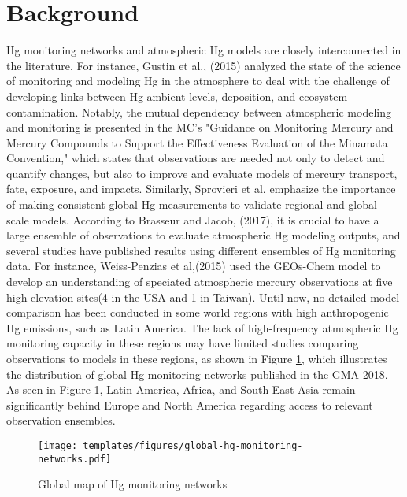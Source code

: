 \section{Background}
\begin{flushleft}

Hg monitoring networks and atmospheric Hg models are closely interconnected in the literature. For instance, Gustin et al., (2015) analyzed the state of the science of monitoring and modeling Hg in the atmosphere to deal with the challenge of developing links between Hg ambient levels, deposition, and ecosystem contamination. Notably, the mutual dependency between atmospheric modeling and monitoring is presented in the MC's "Guidance on Monitoring Mercury and Mercury Compounds to Support the Effectiveness Evaluation of the Minamata Convention," which states that observations are needed not only to detect and quantify changes, but also to improve and evaluate models of mercury transport, fate, exposure, and impacts\cite{unep_guidance_2021}. Similarly, Sprovieri et al. emphasize the importance of making consistent global Hg measurements to validate regional and global-scale models\cite{sprovieri_atmospheric_2016}.  According to Brasseur and Jacob, (2017), it is crucial to have a large ensemble of observations to evaluate atmospheric Hg modeling outputs, and several studies have published results using different ensembles of Hg monitoring data. For instance, Weiss-Penzias et al,(2015) used the GEOs-Chem model to develop an understanding of speciated atmospheric mercury observations at five high elevation sites(4 in the USA and 1 in Taiwan)\cite{weiss-penzias_use_2015}. Until now, no detailed model comparison has been conducted in some world regions with high anthropogenic Hg emissions, such as Latin America. The lack of high-frequency atmospheric Hg monitoring capacity in these regions may have limited studies comparing observations to models in these regions, as shown in Figure \ref{fig:global-hg-monitoring-networks}, which illustrates the distribution of global Hg monitoring networks published in the GMA 2018. As seen in Figure \ref{fig:global-hg-monitoring-networks}, Latin America, Africa, and South East Asia remain significantly behind Europe and North America regarding access to relevant observation ensembles. 
\end{flushleft}

\begin{figure}[H]
  \texttt{[image: templates/figures/global-hg-monitoring-networks.pdf]}
  \caption{Global map of Hg monitoring networks \cite{united_nations_environment_programme_technical_2019}}
  \label{fig:global-hg-monitoring-networks}
  \centering
  
\end{figure}
\FloatBarrier

